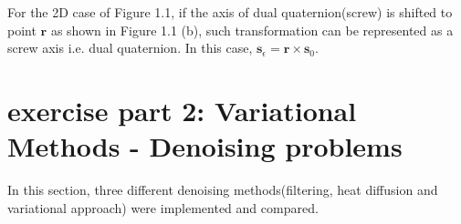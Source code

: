 \documentclass[paper=a4, fontsize=11pt]{scrartcl} %
\numberwithin{equation}{section} %
\numberwithin{figure}{section} %
\numberwithin{table}{section} %
\renewcommand{\vec}[1]{\mathbf{#1}}
\begin{document}
\begin{itemize}
	For the 2D case of Figure 1.1, if the axis of dual quaternion(screw) is shifted to point $\vec{r}$ as shown in Figure 1.1 (b), such transformation can be represented as a screw axis i.e. dual quaternion. In this case, $\vec{s}_\epsilon = \vec{r} \times \vec{s}_0$.
	
\end{itemize}

\pagebreak


\section{exercise part 2: Variational Methods - Denoising problems}

In this section, three different denoising methods(filtering, heat diffusion and variational approach) were implemented and compared.
\end{document}
